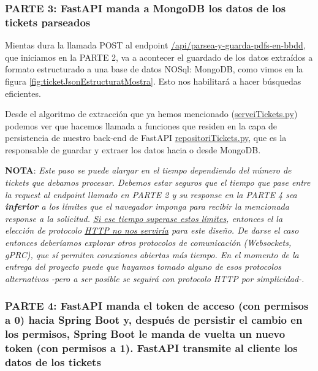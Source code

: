 \documentclass[a4paper,12pt]{report}
\begin{document}
		
	
		
		\subsubsection{PARTE 3: FastAPI manda a MongoDB los datos de los tickets parseados}
		\label{sec:PARTE3_FASTAPI}
		
		
		Mientas dura la llamada POST al endpoint \href{https://github.com/blackcub3s/mercApp/blob/f5413ed8cf7ed88c5ed18299564b836d27c52bd4/APP%20WEB/__FastAPI__/app/controlador.py#L132-L152}{/api/parsea-y-guarda-pdfs-en-bbdd}, que iniciamos en la PARTE 2, va a acontecer el guardado de los datos extraídos a formato estructurado a una base de datos NOSql: MongoDB, como vimos en la figura \ref{fig:ticketJsonEstructuratMostra}. Esto nos habilitará a hacer búsquedas eficientes.
		
		Desde el algoritmo de extracción que ya hemos mencionado (\href{https://github.com/blackcub3s/mercApp/blob/main/APP%20WEB/__FastAPI__/app/serveiTickets.py}{serveiTickets.py}) podemos ver que hacemos llamada a funciones que residen en la capa de persistencia de nuestro back-end de FastAPI \href{https://github.com/blackcub3s/mercApp/blob/main/APP%20WEB/__FastAPI__/app/repositoriTickets.py}{repositoriTickets.py}, que es la responsable de guardar y extraer los datos hacia o desde MongoDB.
		
		\textbf{NOTA}: \textit{Este paso se puede alargar en el tiempo dependiendo del número de tickets que debamos procesar. Debemos estar seguros que el tiempo que pase entre la \textit{request} al endpoint llamado en PARTE 2 y su \textit{response} en la PARTE 4 sea \textbf{inferior} a los límites que el navegador imponga para recibir la mencionada \textit{response} a la solicitud. \underline{Si ese tiempo superase estos límites}, entonces el la elección de protocolo \underline{HTTP no nos serviría} para este diseño. De darse el caso entonces deberíamos explorar otros protocolos de comunicación (Websockets, gPRC), que sí permiten conexiones abiertas más tiempo. En el momento de la entrega del proyecto puede que hayamos tomado alguno de esos protocolos alternativos  -pero a ser posible se seguirá con protocolo HTTP por simplicidad-.}
		
		
		
		
		
		
		
		
		
		
		\subsubsection{PARTE 4: FastAPI manda el token de acceso (con permisos a 0) hacia Spring Boot y, después de persistir el cambio en los permisos, Spring Boot le manda de vuelta un nuevo token (con permisos a 1). FastAPI transmite al cliente los datos de los tickets}
		\label{sec:PARTE4_FASTAPI}
		
\end{document}
